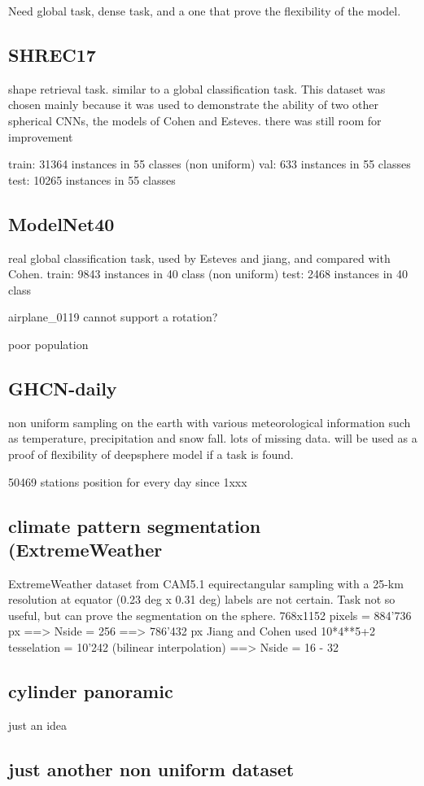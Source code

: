 \documentclass[11pt]{report}
\begin{document}
Need global task, dense task, and a one that prove the flexibility of the model.
\subsection{SHREC17}
shape retrieval task. similar to a global classification task.
This dataset was chosen mainly because it was used to demonstrate the ability of two other spherical CNNs, the models of Cohen and Esteves. there was still room for improvement

train: 31364 instances in 55 classes (non uniform)
val: 633 instances in 55 classes
test: 10265 instances in 55 classes
\subsection{ModelNet40}
real global classification task, used by Esteves and jiang, and compared with Cohen.
train: 9843 instances in 40 class (non uniform)
test: 2468 instances in 40 class

airplane\_0119 cannot support a rotation?

poor population
\subsection{GHCN-daily}
non uniform sampling on the earth with various meteorological information such as temperature, precipitation and snow fall. lots of missing data. will be used as a proof of flexibility of deepsphere model if a task is found.

50469 stations position for every day since 1xxx

\subsection{climate pattern segmentation (ExtremeWeather}
ExtremeWeather dataset from CAM5.1
equirectangular sampling with a 25-km resolution at equator (0.23 deg x 0.31 deg) 
labels are not certain. Task not so useful, but can prove the segmentation on the sphere.
768x1152 pixels = 884'736 px ==> Nside = 256 ==> 786'432 px
Jiang and Cohen used 10*4**5+2 tesselation = 10'242 (bilinear interpolation) ==> Nside = 16 - 32
\subsection{cylinder panoramic}
just an idea
\subsection{just another non uniform dataset}
\end{document}
